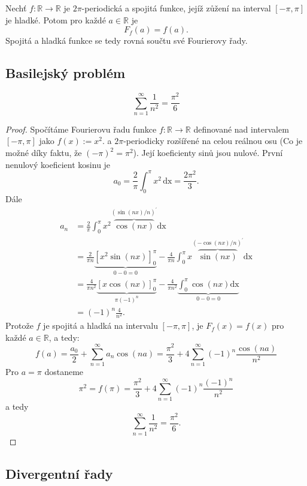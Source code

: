 \documentclass[../main.tex]{subfiles}
\begin{document}
\begin{consequence}
    Nechť $f:\mathbb{R}\to\mathbb{R}$ je $2\pi$-periodická a spojitá funkce, jejíž
    zůžení na interval $[-\pi,\pi]$ je hladké. Potom pro každé $a\in\mathbb{R}$ je
    \[ F_f(a) = f(a). \]
    Spojitá a hladká funkce se tedy rovná součtu své Fourierovy řady.
\end{consequence}

\subsection{Basilejský problém}

\begin{theorem}
    \[ \sum_{n=1}^{\infty} \frac{1}{n^2} = \frac{\pi^2}{6} \]
\end{theorem}
\begin{proof}
    Spočítáme Fourierovu řadu funkce $f:\mathbb{R}\to\mathbb{R}$ definované nad intervalem $[-\pi,\pi]$ jako
    $f(x) := x^2$. a $2\pi$-periodicky rozšířené na celou reálnou osu (Co je možné díky faktu, že $(-\pi)^2 = \pi^2$).
    Její koeficienty sinů jsou nulové. První nenulový koeficient kosinu je
    \[ a_0 = \frac{2}{\pi}\int_{0}^{\pi}x^2\,\text{dx} = \frac{2\pi^2}{3}. \]
    Dále
    \[\begin{aligned}
    a_n & =\frac{2}{\pi} \int_0^\pi x^2 \overbrace{\cos (n x)}^{(\sin (n x) / n)^{\prime}} \mathrm{dx} \\
    & =\frac{2}{\pi n} \underbrace{\left[x^2 \sin (n x)\right]_0^\pi}_{0-0=0}-\frac{4}{\pi n} \int_0^\pi x \overbrace{\sin (n x)}^{(-\cos (n x) / n)^{\prime}} \mathrm{dx} \\
    & =\frac{4}{\pi n^2} \underbrace{[x \cos (n x)]_0^\pi}_{\pi(-1)^n}-\frac{4}{\pi n^2} \underbrace{\int_0^\pi \cos (n x) \mathrm{dx}}_{0-0=0} \\
    & =(-1)^n \frac{4}{n^2}.
    \end{aligned}\]
    Protože $f$ je spojitá a hladká na intervalu $[-\pi,\pi]$, je $F_f(x) = f(x)$
    pro každé $a \in \mathbb{R}$, a tedy:
    \[ f(a)=\frac{a_0}{2}+\sum_{n=1}^{\infty} a_n \cos (n a)=\frac{\pi^2}{3}+4 \sum_{n=1}^{\infty}(-1)^n \frac{\cos (n a)}{n^2} \]
    Pro $a = \pi$ dostaneme
    \[ \pi^2 = f(\pi)=\frac{\pi^2}{3}+4 \sum_{n=1}^{\infty}(-1)^n \frac{(-1)^n}{n^2} \]
    a tedy
    \[ \sum_{n=1}^{\infty} \frac{1}{n^2}=\frac{\pi^2}{6}. \]
\end{proof}

\subsection{Divergentní řady}
\end{document}
